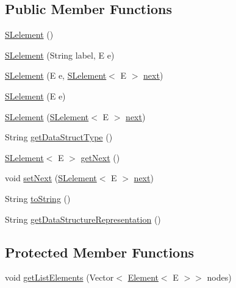 \subsection*{Public Member Functions}
\begin{DoxyCompactItemize}
\item 
\hyperlink{classbridges_1_1base_1_1_s_lelement_ab9c8a08dadd76d7e0c29d7c41cf277c4}{S\+Lelement} ()
\item 
\hyperlink{classbridges_1_1base_1_1_s_lelement_a8e32c9b9e8fc8f9f1eccb14b97e031e7}{S\+Lelement} (String label, E e)
\item 
\hyperlink{classbridges_1_1base_1_1_s_lelement_abc5e333fd2f3289eede108175908f97d}{S\+Lelement} (E e, \hyperlink{classbridges_1_1base_1_1_s_lelement}{S\+Lelement}$<$ E $>$ \hyperlink{classbridges_1_1base_1_1_s_lelement_abf61c96a74ad319d561c6952ea388e0e}{next})
\item 
\hyperlink{classbridges_1_1base_1_1_s_lelement_aa40c4c7bda4d7a852edb21a8ed537cae}{S\+Lelement} (E e)
\item 
\hyperlink{classbridges_1_1base_1_1_s_lelement_ab5b1c20ba1d1923fad0780052fb51c99}{S\+Lelement} (\hyperlink{classbridges_1_1base_1_1_s_lelement}{S\+Lelement}$<$ E $>$ \hyperlink{classbridges_1_1base_1_1_s_lelement_abf61c96a74ad319d561c6952ea388e0e}{next})
\item 
String \hyperlink{classbridges_1_1base_1_1_s_lelement_a8c48a2d34b238fa0ae7bf2d1ee58ea88}{get\+Data\+Struct\+Type} ()
\item 
\hyperlink{classbridges_1_1base_1_1_s_lelement}{S\+Lelement}$<$ E $>$ \hyperlink{classbridges_1_1base_1_1_s_lelement_a060c4671e05e3f20b16630343393b80d}{get\+Next} ()
\item 
void \hyperlink{classbridges_1_1base_1_1_s_lelement_afdd42f03071b2614822b73729e1a5a1a}{set\+Next} (\hyperlink{classbridges_1_1base_1_1_s_lelement}{S\+Lelement}$<$ E $>$ \hyperlink{classbridges_1_1base_1_1_s_lelement_abf61c96a74ad319d561c6952ea388e0e}{next})
\item 
String \hyperlink{classbridges_1_1base_1_1_s_lelement_af0ec4da5b29d0f5ab6ab38e91cca51f9}{to\+String} ()
\item 
String \hyperlink{classbridges_1_1base_1_1_s_lelement_a2928f5e8640deaceeecf01adcd75669b}{get\+Data\+Structure\+Representation} ()
\end{DoxyCompactItemize}
\subsection*{Protected Member Functions}
\begin{DoxyCompactItemize}
\item 
void \hyperlink{classbridges_1_1base_1_1_s_lelement_abadffea339171349a8e86ded9cd3fe21}{get\+List\+Elements} (Vector$<$ \hyperlink{classbridges_1_1base_1_1_element}{Element}$<$ E $>$$>$ nodes)
\end{DoxyCompactItemize}
